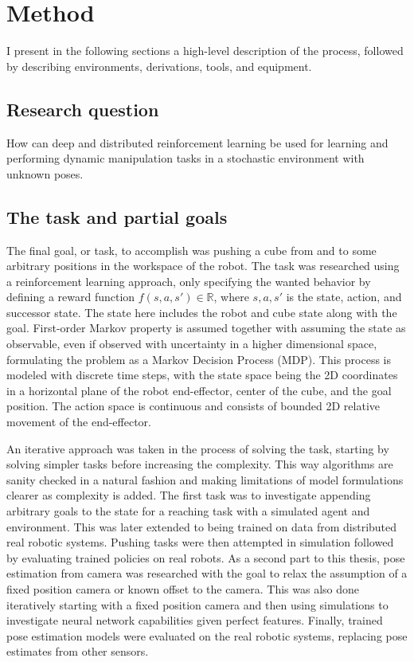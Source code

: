 \chapter{Method}

I present in the following sections a high-level description of the process,
followed by describing environments, derivations, tools, and equipment.

\section{Research question}

How can deep and distributed reinforcement learning be used for learning and
performing dynamic manipulation tasks in a stochastic environment with unknown
poses.

\section{The task and partial goals}

The final goal, or task, to accomplish was pushing a cube from and to some
arbitrary positions in the workspace of the robot. The task was researched
using a reinforcement learning approach, only specifying the wanted behavior by
defining a reward function $f(s, a, s') \in \mathbb{R}$, where $s, a, s'$ is
the state, action, and successor state. The state here includes the robot and
cube state along with the goal. First-order Markov property is assumed together
with assuming the state as observable, even if observed with uncertainty in a
higher dimensional space, formulating the problem as a Markov Decision Process
(MDP). This process is modeled with discrete time steps, with the state space
being the 2D coordinates in a horizontal plane of the robot end-effector,
center of the cube, and the goal position. The action space is continuous and
consists of bounded 2D relative movement of the end-effector.

An iterative approach was taken in the process of solving the task, starting by
solving simpler tasks before increasing the complexity. This way algorithms are
sanity checked in a natural fashion and making limitations of model
formulations clearer as complexity is added. The first task was to investigate
appending arbitrary goals to the state for a reaching task with a simulated
agent and environment. This was later extended to being trained on data from
distributed real robotic systems. Pushing tasks were then attempted in
simulation followed by evaluating trained policies on real robots. As a second
part to this thesis, pose estimation from camera was researched with the goal
to relax the assumption of a fixed position camera or known offset to the
camera. This was also done iteratively starting with a fixed
position camera and then using simulations to investigate neural network
capabilities given perfect features. Finally, trained pose estimation models
were evaluated on the real robotic systems, replacing pose estimates from other
sensors.

